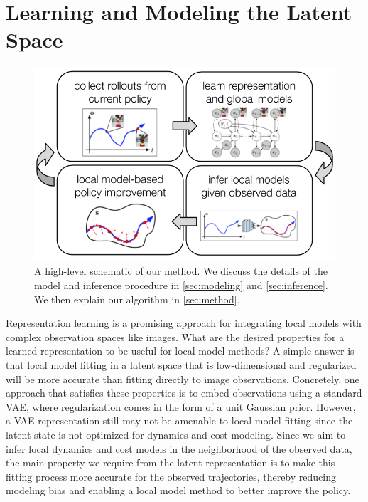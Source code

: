 \section{Learning and Modeling the Latent Space}
\label{sec:modeling}

\begin{figure}
    \centering
    \includegraphics[width=0.9\linewidth]{img/solar/alg.png}
    \caption{A high-level schematic of our method. We discuss the details of the model and inference procedure in \autoref{sec:modeling} and \autoref{sec:inference}. We then explain our algorithm in \autoref{sec:method}.}
    \label{fig:alg}
    \vspace{-.5em}
\end{figure}

Representation learning is a promising approach for integrating local models with complex observation spaces like images. What are the desired properties for a learned representation to be useful for local model methods? A simple answer is that local model fitting in a latent space that is low-dimensional and regularized will be more accurate than fitting directly to image observations. Concretely, one approach that satisfies these properties is to embed observations using a standard VAE, where regularization comes in the form of a unit Gaussian prior. However, a VAE representation still may not be amenable to local model fitting since the latent state is not optimized for dynamics and cost modeling. Since we aim to infer local dynamics and cost models in the neighborhood of the observed data, the main property we require from the latent representation is to make this fitting process more accurate for the observed trajectories, thereby reducing modeling bias and enabling a local model method to better improve the policy.

